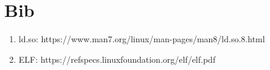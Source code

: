 \documentclass{article}
\begin{document}
\section*{Bib}

    \begin{enumerate}
        \item ld.so: https://www.man7.org/linux/man-pages/man8/ld.so.8.html
        \item ELF: https://refspecs.linuxfoundation.org/elf/elf.pdf
    \end{enumerate}
\end{document}
